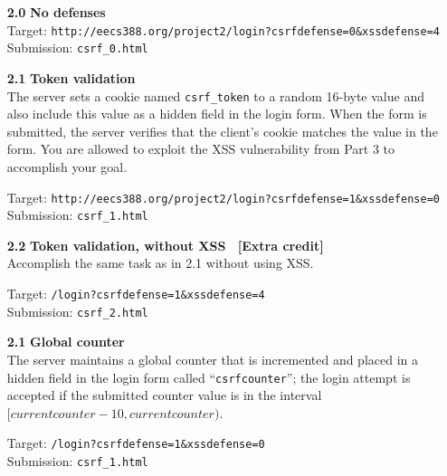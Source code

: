\documentclass[letterpaper,12pt]{article}
\begin{document}
{\begin{enumerate}

\item[\bf 2.0] \textbf{No defenses}\\
{Target: \texttt{http://eecs388.org/project2/login?csrfdefense=0\&xssdefense=4}}\\
{Submission: \texttt{csrf\_0.html}}

\item[\bf 2.1] \textbf{Token validation}\\
The server sets a cookie named \texttt{csrf\_token} to a random 16-byte value and also include this value as a hidden field in the login form.  When the form is submitted, the server verifies that the client's cookie matches the value in the form.  You are allowed to exploit the XSS vulnerability from Part 3 to accomplish your goal.\smallskip

{Target: \texttt{http://eecs388.org/project2/login?csrfdefense=1\&xssdefense=0}}\\
{Submission: \texttt{csrf\_1.html}}

\item[\bf 2.2] \textbf{Token validation, without XSS \ [Extra credit]}\\
Accomplish the same task as in 2.1 without using XSS.\smallskip

{Target: \texttt{/login?csrfdefense=1\&xssdefense=4}}\\
{Submission: \texttt{csrf\_2.html}}

\item[\bf 2.1] \textbf{Global counter}\\
The server maintains a global counter that is incremented and placed in a hidden field in the login form called ``\texttt{csrfcounter}''; the login attempt is accepted if the submitted counter value is in the interval $[currentcounter - 10, currentcounter)$.
\smallskip\\
\smallskip

{Target: \texttt{/login?csrfdefense=1\&xssdefense=0}}\\
{Submission: \texttt{csrf\_1.html}}

\end{enumerate}

}
\end{document}

